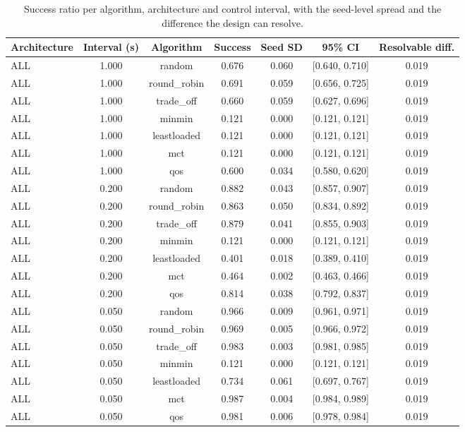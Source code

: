 \begin{table}
\centering
\scriptsize
\caption{Success ratio per algorithm, architecture and control interval, with the seed-level spread and the difference the design can resolve.}
\label{tab:p1-algo-ranking}
\begin{tabular}{lcccccc}
\toprule
Architecture & Interval (s) & Algorithm & Success & Seed SD & 95\% CI & Resolvable diff. \\
\midrule
ALL & 1.000 & random & 0.676 & 0.060 & [0.640, 0.710] & 0.019 \\
ALL & 1.000 & round\_robin & 0.691 & 0.059 & [0.656, 0.725] & 0.019 \\
ALL & 1.000 & trade\_off & 0.660 & 0.059 & [0.627, 0.696] & 0.019 \\
ALL & 1.000 & minmin & 0.121 & 0.000 & [0.121, 0.121] & 0.019 \\
ALL & 1.000 & leastloaded & 0.121 & 0.000 & [0.121, 0.121] & 0.019 \\
ALL & 1.000 & mct & 0.121 & 0.000 & [0.121, 0.121] & 0.019 \\
ALL & 1.000 & qos & 0.600 & 0.034 & [0.580, 0.620] & 0.019 \\
ALL & 0.200 & random & 0.882 & 0.043 & [0.857, 0.907] & 0.019 \\
ALL & 0.200 & round\_robin & 0.863 & 0.050 & [0.834, 0.892] & 0.019 \\
ALL & 0.200 & trade\_off & 0.879 & 0.041 & [0.855, 0.903] & 0.019 \\
ALL & 0.200 & minmin & 0.121 & 0.000 & [0.121, 0.121] & 0.019 \\
ALL & 0.200 & leastloaded & 0.401 & 0.018 & [0.389, 0.410] & 0.019 \\
ALL & 0.200 & mct & 0.464 & 0.002 & [0.463, 0.466] & 0.019 \\
ALL & 0.200 & qos & 0.814 & 0.038 & [0.792, 0.837] & 0.019 \\
ALL & 0.050 & random & 0.966 & 0.009 & [0.961, 0.971] & 0.019 \\
ALL & 0.050 & round\_robin & 0.969 & 0.005 & [0.966, 0.972] & 0.019 \\
ALL & 0.050 & trade\_off & 0.983 & 0.003 & [0.981, 0.985] & 0.019 \\
ALL & 0.050 & minmin & 0.121 & 0.000 & [0.121, 0.121] & 0.019 \\
ALL & 0.050 & leastloaded & 0.734 & 0.061 & [0.697, 0.767] & 0.019 \\
ALL & 0.050 & mct & 0.987 & 0.004 & [0.984, 0.989] & 0.019 \\
ALL & 0.050 & qos & 0.981 & 0.006 & [0.978, 0.984] & 0.019 \\

\end{tabular}
\end{table}
